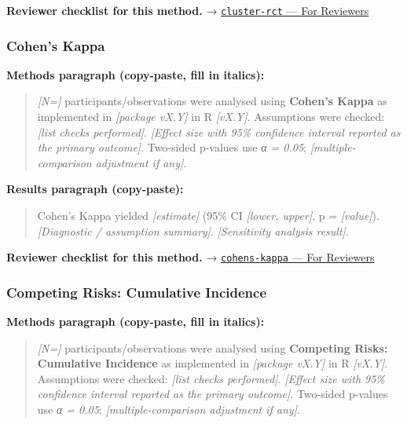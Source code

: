 \documentclass[
]{article}
\begin{document}
\textbf{Reviewer checklist for this method.} →
\href{../chapters/14-clinical/cluster-rct.Rmd\#for-reviewers}{\texttt{cluster-rct}
--- For Reviewers}

\subsubsection{Cohen's Kappa}\label{cohens-kappa}

\textbf{Methods paragraph (copy-paste, fill in italics):}

\begin{quote}
\emph{{[}N={]}} participants/observations were analysed using
\textbf{Cohen's Kappa} as implemented in \emph{{[}package vX.Y{]}} in R
\emph{{[}vX.Y{]}}. Assumptions were checked: \emph{{[}list checks
performed{]}}. \emph{{[}Effect size with 95\% confidence interval
reported as the primary outcome{]}}. Two-sided p-values use \emph{α =
0.05}; \emph{{[}multiple-comparison adjustment if any{]}}.
\end{quote}

\textbf{Results paragraph (copy-paste):}

\begin{quote}
Cohen's Kappa yielded \emph{{[}estimate{]}} (95\% CI \emph{{[}lower,
upper{]}}, p = \emph{{[}value{]}}). \emph{{[}Diagnostic / assumption
summary{]}}. \emph{{[}Sensitivity analysis result{]}}.
\end{quote}

\textbf{Reviewer checklist for this method.} →
\href{../chapters/14-clinical/cohens-kappa.Rmd\#for-reviewers}{\texttt{cohens-kappa}
--- For Reviewers}

\subsubsection{Competing Risks: Cumulative
Incidence}\label{competing-risks-cumulative-incidence}

\textbf{Methods paragraph (copy-paste, fill in italics):}

\begin{quote}
\emph{{[}N={]}} participants/observations were analysed using
\textbf{Competing Risks: Cumulative Incidence} as implemented in
\emph{{[}package vX.Y{]}} in R \emph{{[}vX.Y{]}}. Assumptions were
checked: \emph{{[}list checks performed{]}}. \emph{{[}Effect size with
95\% confidence interval reported as the primary outcome{]}}. Two-sided
p-values use \emph{α = 0.05}; \emph{{[}multiple-comparison adjustment if
any{]}}.
\end{quote}
\end{document}

